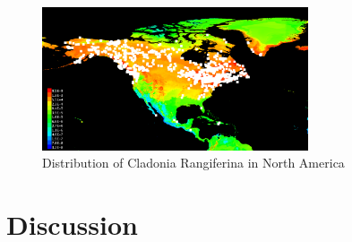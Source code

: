 \documentclass[twoside]{article}
\begin{document}
\begin{figure}[h!]
\centering
\includegraphics[width=0.7\textwidth]{NCladoniaFuture}
\caption{Distribution of Cladonia Rangiferina in North America}
\end{figure}

\section{Discussion}

\small



\end{document}
